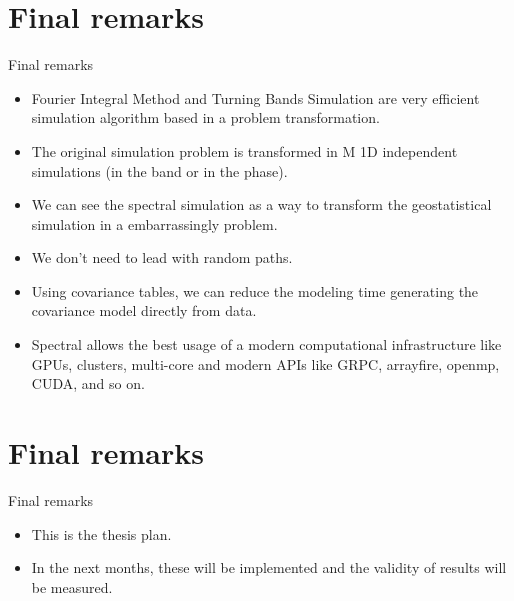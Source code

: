 \section{Final remarks}
\begin{frame}{Final remarks}
\begin{itemize}
	\item Fourier Integral Method and Turning Bands Simulation are very efficient simulation algorithm based in a problem transformation.
    \item The original simulation problem is transformed in M 1D independent simulations (in the band or in the phase).
    \item We can see the spectral simulation as a way to transform the geostatistical simulation in a embarrassingly problem. 
    \item We don't need to lead with random paths.
    \item Using covariance tables, we can reduce the modeling time generating the covariance model directly from data.
    \item Spectral allows the best usage of a modern computational infrastructure like GPUs, clusters, multi-core and modern APIs like GRPC, arrayfire, openmp, CUDA, and so on.
\end{itemize}
\end{frame}


\section{Final remarks}
\begin{frame}{Final remarks}
\begin{itemize}
	\item This is the thesis plan.
    \item In the next months, these will be implemented and the validity of results will be measured. 
\end{itemize}
\end{frame}




